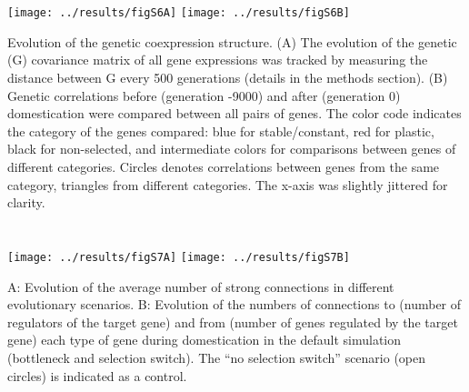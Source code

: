 \documentclass[10pt,a4paper]{article}
\begin{document}
\section{}

\vspace{2cm}

\begin{center}
\texttt{[image: ../results/figS6A]}
\texttt{[image: ../results/figS6B]}
\end{center}

\vspace{2cm}

Evolution of the genetic coexpression structure. (A) The evolution of the genetic (G) covariance matrix of all gene expressions was tracked by measuring the distance between G every 500 generations (details in the methods section). (B) Genetic correlations before (generation -9000) and after (generation 0) domestication were compared between all pairs of genes. The color code indicates the category of the genes compared: blue for stable/constant, red for plastic, black for non-selected, and intermediate colors for comparisons between genes of different categories. Circles denotes correlations between genes from the same category, triangles from different categories. The x-axis was slightly jittered for clarity. 


\clearpage

\section{}

\vspace{2cm}

\begin{center}
\texttt{[image: ../results/figS7A]}
\texttt{[image: ../results/figS7B]}
\end{center}

\vspace{2cm}

A: Evolution of the average number of strong connections in different evolutionary scenarios. B: Evolution of the numbers of connections to (number of regulators of the target gene) and from (number of genes regulated by the target gene) each type of gene during domestication in the default simulation (bottleneck and selection switch). The “no selection switch” scenario (open circles) is indicated as a control. 

\clearpage
\end{document}
